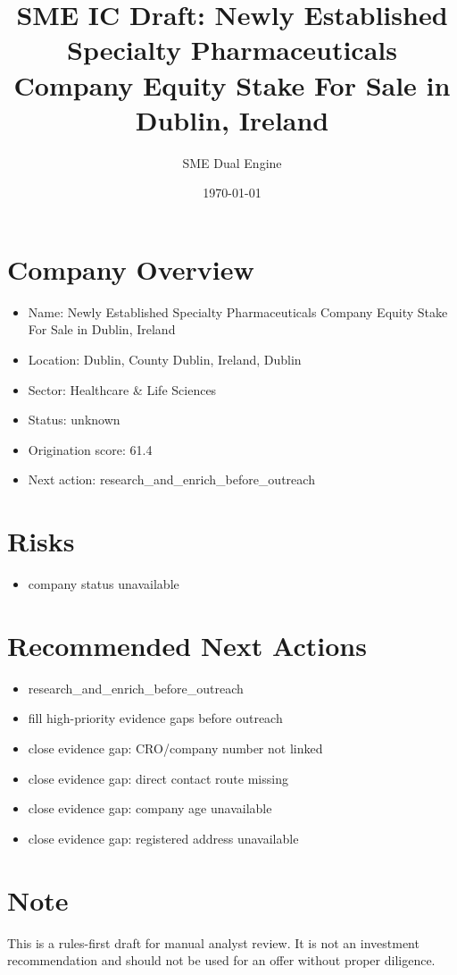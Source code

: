 \documentclass[11pt,a4paper]{article}
\title{SME IC Draft: Newly Established Specialty Pharmaceuticals Company Equity Stake For Sale in Dublin, Ireland}
\author{SME Dual Engine}
\date{\today}
\begin{document}
\maketitle
\section*{Company Overview}
\begin{itemize}[leftmargin=1.4em]
\item Name: Newly Established Specialty Pharmaceuticals Company Equity Stake For Sale in Dublin, Ireland
\item Location: Dublin, County Dublin, Ireland, Dublin
\item Sector: Healthcare \& Life Sciences
\item Status: unknown
\item Origination score: 61.4
\item Next action: research\_and\_enrich\_before\_outreach
\end{itemize}
\section*{Risks}
\begin{itemize}[leftmargin=1.4em]
\item company status unavailable
\end{itemize}
\section*{Recommended Next Actions}
\begin{itemize}[leftmargin=1.4em]
\item research\_and\_enrich\_before\_outreach
\item fill high-priority evidence gaps before outreach
\item close evidence gap: CRO/company number not linked
\item close evidence gap: direct contact route missing
\item close evidence gap: company age unavailable
\item close evidence gap: registered address unavailable
\end{itemize}
\section*{Note}
This is a rules-first draft for manual analyst review. It is not an investment
recommendation and should not be used for an offer without proper diligence.
\end{document}
